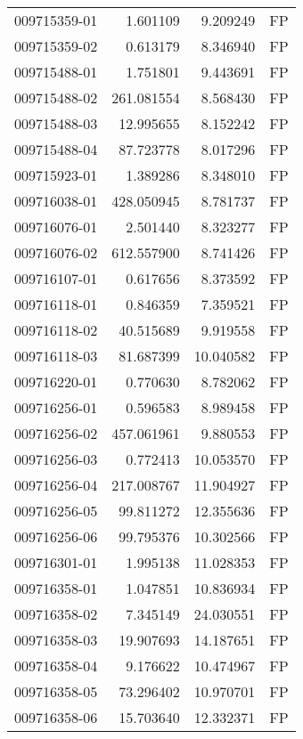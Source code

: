 \begin{tabular}{lrrl}
009715359-01 &    1.601109 &       9.209249 &   FP \\
009715359-02 &    0.613179 &       8.346940 &   FP \\
009715488-01 &    1.751801 &       9.443691 &   FP \\
009715488-02 &  261.081554 &       8.568430 &   FP \\
009715488-03 &   12.995655 &       8.152242 &   FP \\
009715488-04 &   87.723778 &       8.017296 &   FP \\
009715923-01 &    1.389286 &       8.348010 &   FP \\
009716038-01 &  428.050945 &       8.781737 &   FP \\
009716076-01 &    2.501440 &       8.323277 &   FP \\
009716076-02 &  612.557900 &       8.741426 &   FP \\
009716107-01 &    0.617656 &       8.373592 &   FP \\
009716118-01 &    0.846359 &       7.359521 &   FP \\
009716118-02 &   40.515689 &       9.919558 &   FP \\
009716118-03 &   81.687399 &      10.040582 &   FP \\
009716220-01 &    0.770630 &       8.782062 &   FP \\
009716256-01 &    0.596583 &       8.989458 &   FP \\
009716256-02 &  457.061961 &       9.880553 &   FP \\
009716256-03 &    0.772413 &      10.053570 &   FP \\
009716256-04 &  217.008767 &      11.904927 &   FP \\
009716256-05 &   99.811272 &      12.355636 &   FP \\
009716256-06 &   99.795376 &      10.302566 &   FP \\
009716301-01 &    1.995138 &      11.028353 &   FP \\
009716358-01 &    1.047851 &      10.836934 &   FP \\
009716358-02 &    7.345149 &      24.030551 &   FP \\
009716358-03 &   19.907693 &      14.187651 &   FP \\
009716358-04 &    9.176622 &      10.474967 &   FP \\
009716358-05 &   73.296402 &      10.970701 &   FP \\
009716358-06 &   15.703640 &      12.332371 &   FP \\

\end{tabular}
